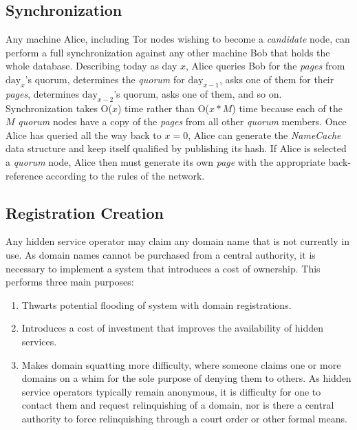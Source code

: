
\subsection{Synchronization}


Any machine Alice, including Tor nodes wishing to become a \emph{candidate} node, can perform a full synchronization against any other machine Bob that holds the whole database. Describing today as day $ x $, Alice queries Bob for the \emph{pages} from $ \textrm{day}_{x} $'s quorum, determines the \emph{quorum} for $ \textrm{day}_{x-1} $, asks one of them for their \emph{pages}, determines $ \textrm{day}_{x-2} $'s quorum, asks one of them, and so on. Synchronization takes O($ x $) time rather than O($ x * M $) time because each of the $ M $ \emph{quorum} nodes have a copy of the \emph{pages} from all other \emph{quorum} members. Once Alice has queried all the way back to $ x = 0 $, Alice can generate the \emph{NameCache} data structure and keep itself qualified by publishing its hash. If Alice is selected a \emph{quorum} node, Alice then must generate its own \emph{page} with the appropriate back-reference according to the rules of the network.

\subsection{Registration Creation}

Any hidden service operator may claim any domain name that is not currently in use. As domain names cannot be purchased from a central authority, it is necessary to implement a system that introduces a cost of ownership. This performs three main purposes: 

\begin{enumerate}
	\item Thwarts potential flooding of system with domain registrations.
	\item Introduces a cost of investment that improves the availability of hidden services.
	\item Makes domain squatting more difficulty, where someone claims one or more domains on a whim for the sole purpose of denying them to others. As hidden service operators typically remain anonymous, it is difficulty for one to contact them and request relinquishing of a domain, nor is there a central authority to force relinquishing through a court order or other formal means.
\end{enumerate}

